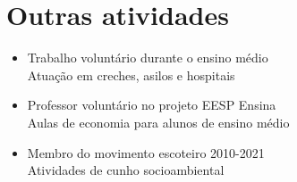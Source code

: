 \documentclass[10pt,letterpaper]{article}
\begin{document}
\section{Outras atividades}
\hspace{-0.6cm}
\begin{minipage}[t]{.47\textwidth}
    \begin{itemize}[itemsep = 0.1cm]
        \item Trabalho voluntário durante o ensino médio\\
        \small \indent Atuação em creches, asilos e hospitais\normalsize
        \item Professor voluntário no projeto EESP Ensina\\
        \small \indent Aulas de economia para alunos de ensino médio\normalsize
    \end{itemize}
\end{minipage}
\hfill
\begin{minipage}[t]{.47\textwidth}
    \begin{itemize}[listparindent=\parindent]
        \item Membro do movimento escoteiro 2010-2021\\
        \small  Atividades de cunho socioambiental
    \end{itemize}
\end{minipage}
\end{document}
